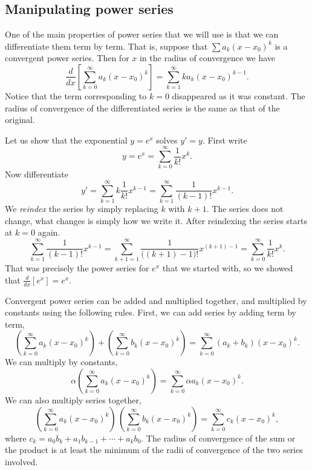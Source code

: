 \subsection{Manipulating power series}

One of the main properties of power series that we will use is
that we can differentiate them term by term.  That is,
suppose that 
$\sum a_k {(x-x_0)}^k$ is a convergent power series.  Then
for $x$ in the radius of convergence we have
\begin{equation*}
\frac{d}{dx}
\left[\sum_{k=0}^\infty a_k {(x-x_0)}^k\right]
=
\sum_{k=1}^\infty k a_k {(x-x_0)}^{k-1} .
\end{equation*}
Notice that the term corresponding to $k=0$ disappeared as
it was constant.  The radius of convergence of the differentiated
series is the same as that of the original.

\begin{example}
Let us show that the exponential $y=e^x$ solves $y'=y$.  First write
\begin{equation*}
y = e^x = \sum_{k=0}^\infty \frac{1}{k!} x^k .
\end{equation*}
Now differentiate
\begin{equation*}
y' = \sum_{k=1}^\infty k \frac{1}{k!} x^{k-1} =
\sum_{k=1}^\infty \frac{1}{(k-1)!} x^{k-1} .
\end{equation*}
We \emph{reindex}
the series by simply replacing $k$ with $k+1$.  The series
does not change, what changes is simply how we write it.  After
reindexing the series starts 
at $k=0$ again.
\begin{equation*}
\sum_{k=1}^\infty \frac{1}{(k-1)!} x^{k-1} =
\sum_{k+1=1}^\infty \frac{1}{\bigl((k+1)-1\bigr)!} x^{(k+1)-1} =
\sum_{k=0}^\infty \frac{1}{k!} x^k .
\end{equation*}
That was precisely the power series for $e^x$ that we started with,
so we showed that $\frac{d}{dx} [ e^x ] = e^x$.
\end{example}

Convergent power series can be added and multiplied together, and multiplied
by constants using the following rules.  First, we can add series by
adding term by term,
\begin{equation*}
\left(\sum_{k=0}^\infty a_k {(x-x_0)}^k\right)
+
\left(\sum_{k=0}^\infty b_k {(x-x_0)}^k\right)
=
\sum_{k=0}^\infty (a_k+b_k) {(x-x_0)}^k .
\end{equation*}
We can multiply by constants,
\begin{equation*}
\alpha
\left(\sum_{k=0}^\infty a_k {(x-x_0)}^k\right)
=
\sum_{k=0}^\infty \alpha a_k {(x-x_0)}^k .
\end{equation*}
We can also multiply series together,
\begin{equation*}
\left(\sum_{k=0}^\infty a_k {(x-x_0)}^k\right)
\,
\left(\sum_{k=0}^\infty b_k {(x-x_0)}^k\right)
=
\sum_{k=0}^\infty c_k {(x-x_0)}^k ,
\end{equation*}
where
$c_k = a_0b_k + a_1 b_{k-1} + \cdots + a_k b_0$.
The radius of convergence of the sum or the product
is at least the minimum of the radii of convergence of
the two series involved.

